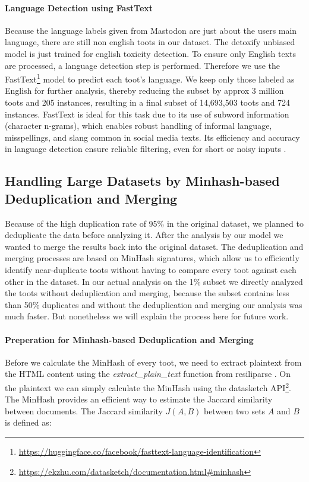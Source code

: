 \paragraph{Language Detection using FastText}
Because the language labels given from Mastodon are just about the users main language, there are still non english toots in our dataset. The detoxify unbiased model is just trained for english toxicity detection. To ensure only English texts are processed, a language detection step is performed. Therefore we use the FastText\footnote{\url{https://huggingface.co/facebook/fasttext-language-identification}} model to predict each toot’s language. We keep only those labeled as English for further analysis, thereby reducing the subset by approx 3 million toots and 205 instances, resulting in a final subset of 14,693,503 toots and 724 instances.
FastText is ideal for this task due to its use of subword information (character n-grams), which enables robust handling of informal language, misspellings, and slang common in social media texts. Its efficiency and accuracy in language detection ensure reliable filtering, even for short or noisy inputs \cite{joulin:2017}.

\subsection*{Handling Large Datasets by Minhash-based Deduplication and Merging}
Because of the high duplication rate of 95\% in the original dataset, we planned to deduplicate the data before analyzing it. After the analysis by our model we wanted to merge the results back into the original dataset. The deduplication and merging processes are based on MinHash signatures, which allow us to efficiently identify near-duplicate toots without having to compare every toot against each other in the dataset. In our actual analysis on the 1\% subset we directly analyzed the toots without deduplication and merging, because the subset contains less than 50\% duplicates and without the deduplication and merging our analysis was much faster. But nonetheless we will explain the process here for future work.

\paragraph{Preperation for Minhash-based Deduplication and Merging}\label{step:preprocess} 
Before we calculate the MinHash of every toot, we need to extract plaintext from the HTML content using the \textit{extract\_plain\_text} function from resiliparse \cite{bevendorff:2018}. On the plaintext we can simply calculate the MinHash using the datasketch API\footnote{\url{https://ekzhu.com/datasketch/documentation.html\#minhash}}. The MinHash provides an efficient way to estimate the Jaccard similarity between documents. The Jaccard similarity $J(A,B)$ between two sets $A$ and $B$ is defined as:

